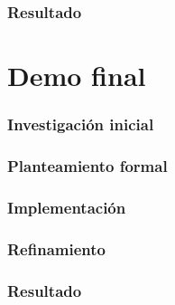 \subsection{Resultado}

\chapter{Demo final}

\subsection{Investigación inicial}
\subsection{Planteamiento formal}
\subsection{Implementación}
\subsection{Refinamiento}
\subsection{Resultado}
